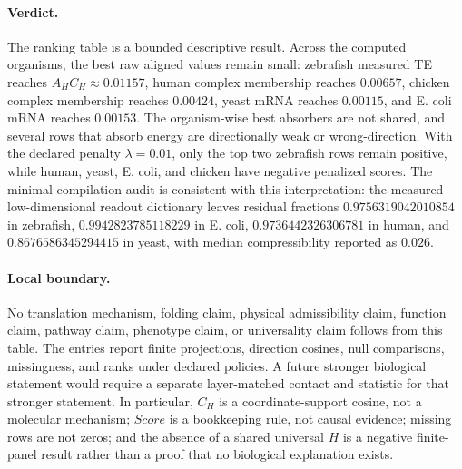 \paragraph{Verdict.}
The ranking table is a bounded descriptive result.  Across the computed organisms, the best raw aligned values remain small: zebrafish measured TE reaches $A_HC_H\approx 0.01157$, human complex membership reaches $0.00657$, chicken complex membership reaches $0.00424$, yeast mRNA reaches $0.00115$, and E. coli mRNA reaches $0.00153$.  The organism-wise best absorbers are not shared, and several rows that absorb energy are directionally weak or wrong-direction.  With the declared penalty $\lambda=0.01$, only the top two zebrafish rows remain positive, while human, yeast, E. coli, and chicken have negative penalized scores.  The minimal-compilation audit is consistent with this interpretation: the measured low-dimensional readout dictionary leaves residual fractions $0.9756319042010854$ in zebrafish, $0.9942823785118229$ in E. coli, $0.9736442326306781$ in human, and $0.8676586345294415$ in yeast, with median compressibility reported as $0.026$.

\paragraph{Local boundary.}
No translation mechanism, folding claim, physical admissibility claim, function claim, pathway claim, phenotype claim, or universality claim follows from this table.  The entries report finite projections, direction cosines, null comparisons, missingness, and ranks under declared policies.  A future stronger biological statement would require a separate layer-matched contact and statistic for that stronger statement.  In particular, $C_H$ is a coordinate-support cosine, not a molecular mechanism; $Score$ is a bookkeeping rule, not causal evidence; missing rows are not zeros; and the absence of a shared universal $H$ is a negative finite-panel result rather than a proof that no biological explanation exists.

